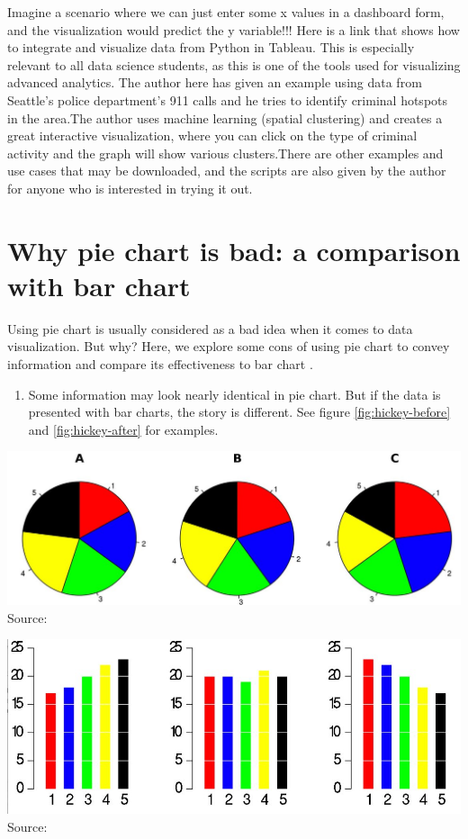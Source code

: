 \documentclass[]{book}
\providecommand{\tightlist}{%
  \setlength{\itemsep}{0pt}\setlength{\parskip}{0pt}}
\theoremstyle{definition}
\theoremstyle{definition}
\theoremstyle{definition}
\theoremstyle{remark}
\begin{document}
Imagine a scenario where we can just enter some x values in a dashboard
form, and the visualization would predict the y variable!!! Here is a
link that shows how to integrate and visualize data from Python in
Tableau. This is especially relevant to all data science students, as
this is one of the tools used for visualizing advanced analytics. The
author here has given an example using data from Seattle's police
department's 911 calls and he tries to identify criminal hotspots in the
area.The author uses machine learning (spatial clustering) and creates a
great interactive visualization, where you can click on the type of
criminal activity and the graph will show various clusters.There are
other examples and use cases that may be downloaded, and the scripts are
also given by the author for anyone who is interested in trying it out.

\section{Why pie chart is bad: a comparison with bar
chart}\label{why-pie-chart-is-bad-a-comparison-with-bar-chart}

Using pie chart is usually considered as a bad idea when it comes to
data visualization. But why? Here, we explore some cons of using pie
chart to convey information and compare its effectiveness to bar chart
\citep{hickey-pie-worst} \citep{henry-defense-pie} \citep{quach-penny}.

\begin{enumerate}
\def\labelenumi{\arabic{enumi}.}
\tightlist
\item
  Some information may look nearly identical in pie chart. But if the
  data is presented with bar charts, the story is different. See figure
  \ref{fig:hickey-before} and \ref{fig:hickey-after} for examples.
\end{enumerate}

\includegraphics{images/hickey-before.jpg} Source:
\citep{hickey-pie-worst}

\includegraphics{images/hickey-after.jpg} Source:
\citep{hickey-pie-worst}
\end{document}
